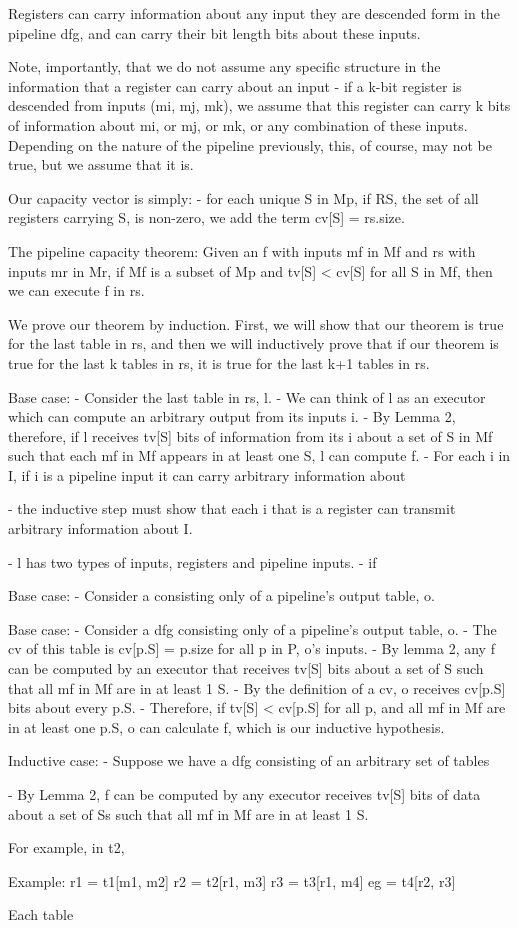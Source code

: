 Registers can carry information about any input they are descended form in the pipeline dfg, and can carry their bit length bits about these inputs.

Note, importantly, that we do not assume any specific structure in the information that a register can carry about an input - if a k-bit register is descended from inputs (mi, mj, mk), we assume that this register can carry k bits of information about mi, or mj, or mk, or any combination of these inputs. Depending on the nature of the pipeline previously, this, of course, may not be true, but we assume that it is.

Our capacity vector is simply:
- for each unique S in Mp, if RS, the set of all registers carrying S, is non-zero, we add the term cv[S] = rs.size.

The pipeline capacity theorem: Given an f with inputs mf in Mf and rs with inputs mr in Mr, if Mf is a subset of Mp and tv[S] < cv[S] for all S in Mf, then we can execute f in rs.

We prove our theorem by induction. First, we will show that our theorem is true for the last table in rs, and then we will inductively prove that if our theorem is true for the last k tables in rs, it is true for the last k+1 tables in rs.

Base case:
- Consider the last table in rs, l.
- We can think of l as an executor which can compute an arbitrary output from its inputs i.
- By Lemma 2, therefore, if l receives tv[S] bits of information from its i about a set of S in Mf such that each mf in Mf appears in at least one S, l can compute f.
- For each i in I, if i is a pipeline input it can carry arbitrary information about 


- the inductive step must show that each i that is a register can transmit arbitrary information about I. 


- l has two types of inputs, registers and pipeline inputs.
- if 



Base case:
- Consider a  consisting only of a pipeline's output table, o.


Base case:
- Consider a dfg consisting only of a pipeline's output table, o. 
- The cv of this table is cv[p.S] = p.size for all p in P, o's inputs.
- By lemma 2, any f can be computed by an executor that receives tv[S] bits
  about a set of S such that all mf in Mf are in at least 1 S.
- By the definition of a cv, o receives cv[p.S] bits about every p.S.
- Therefore, if tv[S] < cv[p.S] for all p, and all mf in Mf are in at least one p.S, o can calculate f, which is our inductive hypothesis.

Inductive case:
- Suppose we have a dfg consisting of an arbitrary set of tables  


- By Lemma 2, f can be computed by any executor receives tv[S] bits of data about a set of Ss such that all mf in Mf are in at least 1 S.



For example, in t2,

Example:
r1 = t1[m1, m2]
r2 = t2[r1, m3]
r3 = t3[r1, m4]
eg = t4[r2, r3]

Each table


